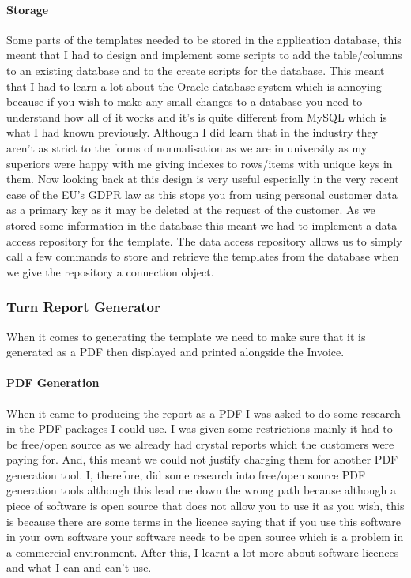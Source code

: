 {{		\paragraph{Storage}{Some parts of the templates needed to be stored in the application database, this meant that I had to design and implement some scripts to add the table/columns to an existing database and to the create scripts for the database. This meant that I had to learn a lot about the Oracle database system which is annoying because if you wish to make any small changes to a database you need to understand how all of it works and it's is quite different from MySQL which is what I had known previously. Although I did learn that in the industry they aren't as strict to the forms of normalisation as we are in university as my superiors were happy with me giving indexes to rows/items with unique keys in them. Now looking back at this design is very useful especially in the very recent case of the EU's GDPR law as this stops you from using personal customer data as a primary key as it may be deleted at the request of the customer. As we stored some information in the database this meant we had to implement a data access repository for the template. The data access repository allows us to simply call a few commands to store and retrieve the templates from the database when we give the repository a connection object.}
	}
	\subsubsection*{Turn Report Generator}{
		When it comes to generating the template we need to make sure that it is generated as a PDF then displayed and printed alongside the Invoice.
		\paragraph{PDF Generation}{
			When it came to producing the report as a PDF I was asked to do some research in the PDF packages I could use. I was given some restrictions mainly it had to be free/open source as we already had crystal reports which the customers were paying for. And, this meant we could not justify charging them for another PDF generation tool. I, therefore, did some research into free/open source PDF generation tools although this lead me down the wrong path because although a piece of software is open source that does not allow you to use it as you wish, this is because there are some terms in the licence saying that if you use this software in your own software your software needs to be open source which is a problem in a commercial environment. After this, I learnt a lot more about software licences and what I can and can't use.
		}
}}
